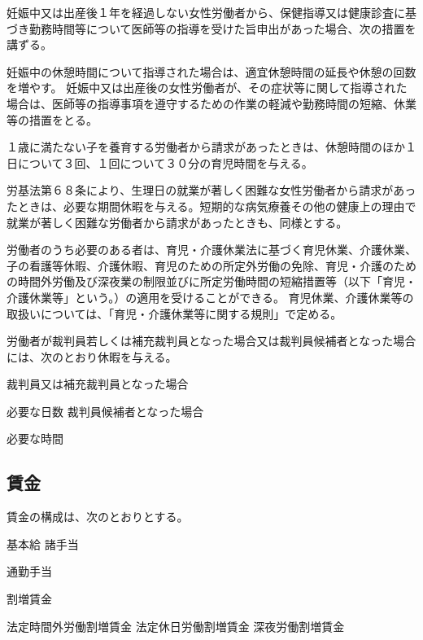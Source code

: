 \documentclass[10pt,a4paper,uplatex]{jsarticle}
\begin{document}
\term
妊娠中又は出産後１年を経過しない女性労働者から、保健指導又は健康診査に基づき勤務時間等について医師等の指導を受けた旨申出があった場合、次の措置を講ずる。
\begin{enumerate}
    \itm 妊娠中の休憩時間について指導された場合は、適宜休憩時間の延長や休憩の回数を増やす。
    \itm 妊娠中又は出産後の女性労働者が、その症状等に関して指導された場合は、医師等の指導事項を遵守するための作業の軽減や勤務時間の短縮、休業等の措置をとる。
\end{enumerate}

１歳に満たない子を養育する労働者から請求があったときは、休憩時間のほか１日について３回、１回について３０分の育児時間を与える。

労基法第６８条により、生理日の就業が著しく困難な女性労働者から請求があったときは、必要な期間休暇を与える。短期的な病気療養その他の健康上の理由で就業が著しく困難な労働者から請求があったときも、同様とする。

労働者のうち必要のある者は、育児・介護休業法に基づく育児休業、介護休業、子の看護等休暇、介護休暇、育児のための所定外労働の免除、育児・介護のための時間外労働及び深夜業の制限並びに所定労働時間の短縮措置等（以下「育児・介護休業等」という。）の適用を受けることができる。
\term
育児休業、介護休業等の取扱いについては、「育児・介護休業等に関する規則」で定める。

労働者が裁判員若しくは補充裁判員となった場合又は裁判員候補者となった場合には、次のとおり休暇を与える。
\begin{enumerate}
    \itm 裁判員又は補充裁判員となった場合 \par 必要な日数
    \itm 裁判員候補者となった場合\par 必要な時間
\end{enumerate}


\subsection{賃金}

賃金の構成は、次のとおりとする。
\begin{enumerate}
    \itm 基本給
    \itm 諸手当
    \begin{enumerate}
        \itm 通勤手当
    \end{enumerate}
    \itm 割増賃金
    \begin{enumerate}
        \itm 法定時間外労働割増賃金
        \itm 法定休日労働割増賃金
        \itm 深夜労働割増賃金
    \end{enumerate}
\end{enumerate}
\end{document}
